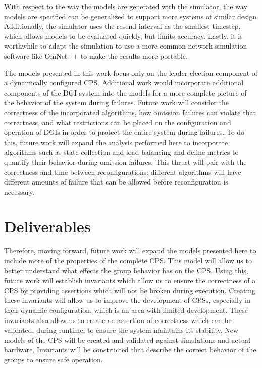 With respect to the way the models are generated with the simulator, the way models are specified can be generalized to support more systems of similar design.
Additionally, the simulator uses the resend interval as the smallest timestep, which allows models to be evaluated quickly, but limits accuracy.
Lastly, it is worthwhile to adapt the simulation to use a more common network simulation software like OmNet++\cite{OMNET} to make the results more portable.

The models presented in this work focus only on the leader election component of a dynamically configured CPS.
Additional work would incorporate additional components of the DGI system into the models for a more complete picture of the behavior of the system during failures.
Future work will consider the correctness of the incorporated algorithms, how omission failures can violate that correctness, and what restrictions can be placed on the configuration and operation of DGIs in order to protect the entire system during failures.
To do this, future work will expand the analysis performed here to incorporate algorithms such as state collection and load balancing and define metrics to quantify their behavior during omission failures.
This thrust will pair with the correctness and time between reconfigurations: different algorithms will have different amounts of failure that can be allowed before reconfiguration is necessary.

\section{Deliverables}

Therefore, moving forward, future work will expand the models presented here to include more of the properties of the complete CPS.
This model will allow us to better understand what effects the group behavior has on the CPS.
Using this, future work will establish invariants which allow us to ensure the correctness of a CPS by providing assertions which will not be broken during execution.
Creating these invariants will allow us to improve the development of CPSs, especially in their dynamic configuration, which is an area with limited development.
These invariants also allow us to create an assertion of correctness which can be validated, during runtime, to ensure the system maintains its stability.
New models of the CPS will be created and validated against simulations and actual hardware.
Invariants will be constructed that describe the correct behavior of the groups to ensure safe operation.


